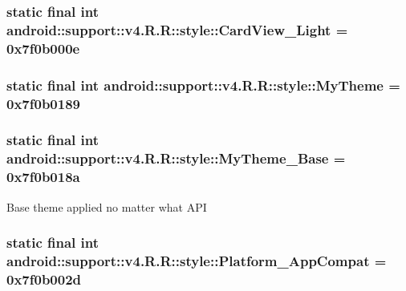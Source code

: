 \hypertarget{classandroid_1_1support_1_1v4_1_1_r_1_1style_f8b4c7e6a1ecc4397d6a56cf0ca077d1}{
\subsubsection[{CardView\_\-Light}]{\setlength{\rightskip}{0pt plus 5cm}static final int android::support::v4.R.R::style::CardView\_\-Light = 0x7f0b000e}}
\label{classandroid_1_1support_1_1v4_1_1_r_1_1style_f8b4c7e6a1ecc4397d6a56cf0ca077d1}


\hypertarget{classandroid_1_1support_1_1v4_1_1_r_1_1style_f3feb579ef529638f7d9663e523639d9}{
\subsubsection[{MyTheme}]{\setlength{\rightskip}{0pt plus 5cm}static final int android::support::v4.R.R::style::MyTheme = 0x7f0b0189}}
\label{classandroid_1_1support_1_1v4_1_1_r_1_1style_f3feb579ef529638f7d9663e523639d9}


\hypertarget{classandroid_1_1support_1_1v4_1_1_r_1_1style_d6a18e2f8986fa0cfba17e9f852a829c}{
\subsubsection[{MyTheme\_\-Base}]{\setlength{\rightskip}{0pt plus 5cm}static final int android::support::v4.R.R::style::MyTheme\_\-Base = 0x7f0b018a}}
\label{classandroid_1_1support_1_1v4_1_1_r_1_1style_d6a18e2f8986fa0cfba17e9f852a829c}


Base theme applied no matter what API \hypertarget{classandroid_1_1support_1_1v4_1_1_r_1_1style_9407d9a9827398040d6006a2849ffac5}{
\subsubsection[{Platform\_\-AppCompat}]{\setlength{\rightskip}{0pt plus 5cm}static final int android::support::v4.R.R::style::Platform\_\-AppCompat = 0x7f0b002d}}
\label{classandroid_1_1support_1_1v4_1_1_r_1_1style_9407d9a9827398040d6006a2849ffac5}


